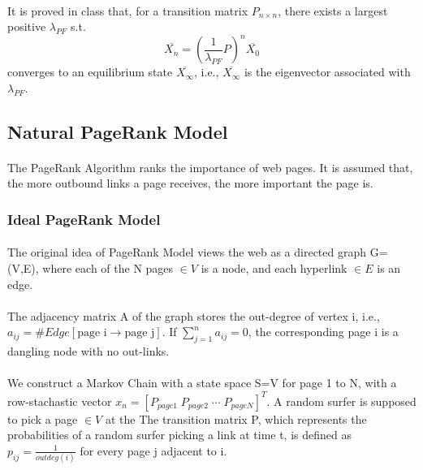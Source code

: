 \documentclass{article}
\begin{document}
        \paragraph{}
        It is proved in class that, for a transition matrix $P_{n\times n}$, there exists a largest positive $\lambda_{PF}$ s.t.
        $$\overline{X_n}=(\frac{1}{\lambda_{PF}}P)^n\overline{X_0}$$
        converges to an equilibrium state $\overline{X_\infty}$, i.e., $\overline{X_\infty}$ is the eigenvector associated with $\lambda_{PF}$.
      \subsection{Natural PageRank Model}
      \paragraph{}
        The PageRank Algorithm ranks the importance of web pages. It is assumed that, the more outbound links a page receives, the more important the page is.
        \subsubsection{Ideal PageRank Model}
        \paragraph{}
        The original idea of PageRank Model views the web as a directed graph G=(V,E), where each of the N pages $\in V$ is a node, and each hyperlink $\in E$ is an edge.
        \paragraph{}
        The adjacency matrix A of the graph stores the out-degree of vertex i, i.e., $a_{ij}=\#Edge[\text{page i}\rightarrow\text{page j}]$. If $\sum^n_{j=1}a_{ij}=0$, the corresponding page i is a dangling node with no out-links.
        \paragraph{}
        We construct a Markov Chain with a state space S=V for page 1 to N, with a row-stachastic vector $x_n=\left[P_{page1}\;P_{page2}\;\cdots\;P_{pageN}\right]^T$.
        A random surfer is supposed to pick a page $\in V$ at the 
        The transition matrix P, which represents the probabilities of a random surfer picking a link at time t, is defined as $p_{ij}=\frac{1}{outdeg(i)}$ for every page j adjacent to i.
\end{document}
